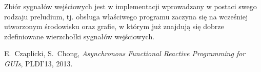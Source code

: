 \documentclass[11pt,leqno]{article}
\begin{document}
Zbiór sygnałów wejściowych jest w implementacji wprowadzany w postaci swego rodzaju preludium, tj. obsługa właściwego programu zaczyna się na wcześniej utworzonym środowisku oraz grafie, w którym już znajdują się dobrze zdefiniowane wierzchołki sygnałów wejściowych.

\thispagestyle{empty}
\begin{thebibliography}{99}

   E.~Czaplicki, S.~Chong, \textit{Asynchronous Functional Reactive Programming for GUIs},
              PLDI’13, 2013.
	  
\end{thebibliography}
\end{document}
